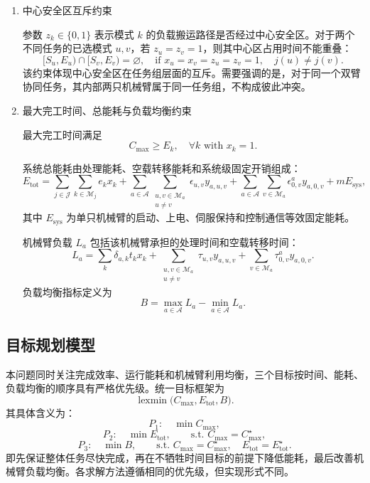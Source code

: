 \begin{enumerate}
相应的空载转移能耗记为
\[
    \epsilon_{u,v}=\alpha_0\|q_u-p_v\|_2\cdot \kappa_e,
    \qquad
    \epsilon^a_{0,v}=\alpha_0\|o_a-p_v\|_2\cdot \kappa_e,
\]
首任务从待机位置出发时同理计算。该项将计入系统总能耗。

\item 中心安全区互斥约束

参数 $z_k\in\{0,1\}$ 表示模式 $k$ 的负载搬运路径是否经过中心安全区。对于两个不同任务的已选模式 $u,v$，若 $z_u=z_v=1$，则其中心区占用时间不能重叠：
\[
    [S_u,E_u)\cap [S_v,E_v)=\varnothing,
    \quad \text{if }x_u=x_v=z_u=z_v=1,
    \quad j(u)\ne j(v).
\]
该约束体现中心安全区在任务组层面的互斥。需要强调的是，对于同一个双臂协同任务，其内部两只机械臂属于同一任务组，不构成彼此冲突。

\item 最大完工时间、总能耗与负载均衡约束

最大完工时间满足
\[
    C_{\max}\ge E_k,\quad \forall k \text{ with } x_k=1.
\]

系统总能耗由处理能耗、空载转移能耗和系统级固定开销组成：
\[
    E_{\mathrm{tot}}
    =
    \sum_{j\in\mathcal{J}}\sum_{k\in\mathcal{M}_j}e_kx_k
    +\sum_{a\in\mathcal{A}}\sum_{\substack{u,v\in\mathcal M_a\\u\ne v}}
    \epsilon_{u,v}y_{a,u,v}
    +\sum_{a\in\mathcal A}\sum_{v\in\mathcal M_a}
    \epsilon^a_{0,v}y_{a,0,v}
    +mE_{\mathrm{sys}},
\]
其中 $E_{\mathrm{sys}}$ 为单只机械臂的启动、上电、伺服保持和控制通信等效固定能耗。

机械臂负载 $L_a$ 包括该机械臂承担的处理时间和空载转移时间：
\[
    L_a=
    \sum_k\delta_{a,k}t_kx_k
    +\sum_{\substack{u,v\in\mathcal M_a\\u\ne v}}\tau_{u,v}y_{a,u,v}
    +\sum_{v\in\mathcal M_a}\tau^a_{0,v}y_{a,0,v}.
\]
负载均衡指标定义为
\[
    B=\max_{a\in\mathcal{A}}L_a-\min_{a\in\mathcal{A}}L_a.
\]
\end{enumerate}

\subsection{目标规划模型}

本问题同时关注完成效率、运行能耗和机械臂利用均衡，三个目标按时间、能耗、负载均衡的顺序具有严格优先级。统一目标框架为
\[
    \operatorname{lexmin}\bigl(C_{\max},E_{\mathrm{tot}},B\bigr).
\]
其具体含义为：
\[
    P_1:\quad \min C_{\max},
\]
\[
    P_2:\quad \min E_{\mathrm{tot}},
    \qquad \text{s.t. }C_{\max}=C_{\max}^{\star},
\]
\[
    P_3:\quad \min B,
    \qquad \text{s.t. }C_{\max}=C_{\max}^{\star},\quad
    E_{\mathrm{tot}}=E_{\mathrm{tot}}^{\star}.
\]
即先保证整体任务尽快完成，再在不牺牲时间目标的前提下降低能耗，最后改善机械臂负载均衡。各求解方法遵循相同的优先级，但实现形式不同。

